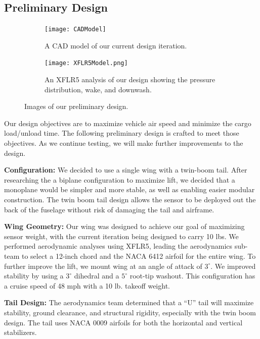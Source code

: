 \documentclass[proposal]{byu-aero}
\begin{document}
\subsection{Preliminary Design}
\label{ssec:preliminarydesign}

\begin{figure}[h!]
	\centering
	\begin{subfigure}[t]{0.45\textwidth} %
		\centering
	    \texttt{[image: CADModel]}
		\caption{A CAD model of our current design iteration.}
		\label{fig:CAD Model}
	\end{subfigure}
	\hfill
	\begin{subfigure}[t]{0.45\textwidth} %
		\centering
		\texttt{[image: XFLR5Model.png]}
		\caption{An XFLR5 analysis of our design showing the pressure distribution, wake, and downwash.}
		\label{fig:XFLR5 Model}
	\end{subfigure}
	\caption{Images of our preliminary design.}
	\label{fig:prelimdesign}
\end{figure}


Our design objectives are to maximize vehicle air speed and minimize the cargo load/unload time. The following preliminary design is crafted to meet those objectives. As we continue testing, we will make further improvements to the design.

\noindent \textbf{Configuration:} We decided to use a single wing with a twin-boom tail. After researching the a biplane configuration to maximize lift, we decided that a monoplane would be simpler and more stable, as well as enabling easier modular construction. The twin boom tail design allows the sensor to be deployed out the back of the fuselage without risk of damaging the tail and airframe.


\noindent \textbf{Wing Geometry:} Our wing was designed to achieve our goal of maximizing sensor weight, with the current iteration being designed to carry 10 lbs. We performed aerodynamic analyses using XFLR5, leading the aerodynamics sub-team to select a 12-inch chord and the NACA 6412 airfoil for the entire wing. To further improve the lift, we mount wing at an angle of attack of \(3^\circ\). We improved stability by using a \(3^\circ\) dihedral and a \(5^\circ\) root-tip washout. This configuration has a cruise speed of 48 mph with a 10 lb. takeoff weight.

\noindent \textbf{Tail Design:} The aerodynamics team determined that a “U” tail will maximize stability, ground clearance, and structural rigidity, especially with the twin boom design. The tail uses NACA 0009 airfoils for both the horizontal and vertical stabilizers.
\end{document}
